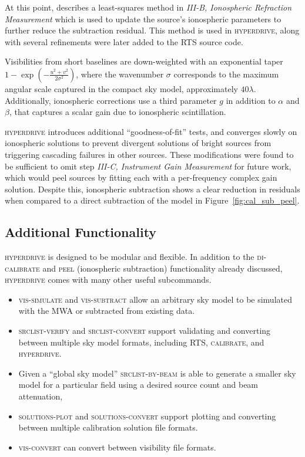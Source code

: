 \documentclass[summary]{ursi}
\newcommand{\hyperdrive}{\textsc{hyperdrive}}\newcommand{\mwalib}{\textsc{mwalib}}
\newcommand{\rts}{\textsc{RTS}}
\newcommand{\calibrate}{\textsc{calibrate}}
\begin{document}
At this point, \cite{mitchell2008} describes a least-squares method in \textit{III-B, Ionospheric Refraction Measurement} which is used to update the source's ionospheric parameters to further reduce the subtraction residual. This method is used in \hyperdrive{}, along with several refinements were later added to the \rts{} source code.

Visibilities from short baselines are down-weighted with an exponential taper $1-\exp\left(-\frac{u^2+v^2}{2\sigma^2}\right)$, where the wavenumber $\sigma$ corresponds to the maximum angular scale captured in the compact sky model, approximately $40\lambda$. 
Additionally, ionospheric corrections use a third parameter $g$ in addition to $\alpha$ and $\beta$, that captures a scalar gain due to ionospheric scintillation. 

\hyperdrive{} introduces additional ``goodness-of-fit'' tests, and converges slowly on ionospheric solutions to prevent divergent solutions of bright sources from triggering cascading failures in other sources. 
These modifications were found to be sufficient to omit step \textit{III-C, Instrument Gain Measurement} for future work, which would peel sources by fitting each with a per-frequency complex gain solution. Despite this, ionospheric subtraction shows a clear reduction in residuals when compared to a direct subtraction of the model in Figure~\ref{fig:cal_sub_peel}.

\subsection{Additional Functionality}
\hyperdrive{} is designed to be modular and flexible. 
In addition to the \textsc{di-calibrate} and \textsc{peel} (ionospheric subtraction) functionality already discussed, \hyperdrive{} comes with many other useful subcommands.

\begin{itemize}
  \item \textsc{vis-simulate} and \textsc{vis-subtract} allow an arbitrary sky model to be simulated with the MWA or subtracted from existing data.
  \item \textsc{srclist-verify} and \textsc{srclist-convert} support validating and converting between multiple sky model formats, including \rts{}, \calibrate{}, and \hyperdrive{}.
  \item Given a ``global sky model'' \textsc{srclist-by-beam} is able to generate a smaller sky model for a particular field using a desired source count and beam attenuation,
  \item \textsc{solutions-plot} and \textsc{solutions-convert} support plotting and converting between multiple calibration solution file formats.
  \item \textsc{vis-convert} can convert between visibility file formats.
\end{itemize}
\end{document}
